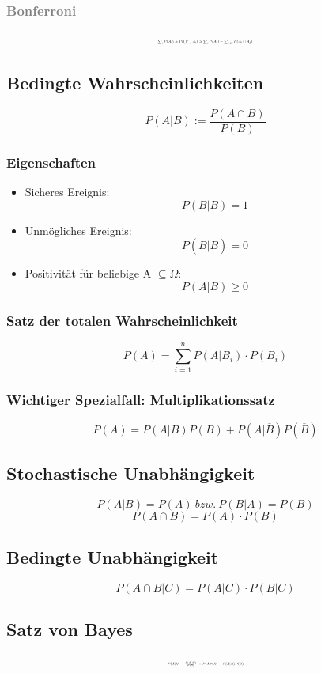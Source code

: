 \documentclass[10pt,a4paper,landscape]{article}
\begin{document}
\begin{multicols}{4}
\textcolor{gray}{\subsubsection*{Bonferroni}
\[ \resizebox{0.25\textwidth}{!}{$
\sum_i P(A_i)\geqslant P(\bigcup_{i=1}^nA_i)\geqslant \sum_i P(A_i) - \sum_{i<j}P(A_i \cup A_j)
$}
\]
}

\subsection{Bedingte Wahrscheinlichkeiten}
\[
P(A|B) := \frac{P(A\cap B)}{P(B)}
\]

\subsubsection*{Eigenschaften}
\begin{itemize}
\item Sicheres Ereignis:
\[
P(B|B) = 1
\]
\item Unmögliches Ereignis:
\[
P(\overline{B}|B) = 0
\]
\item Positivität für beliebige A $\subseteq \Omega$:
\[
P(A|B)\geqslant 0
\]
\end{itemize}

\subsubsection*{Satz der totalen Wahrscheinlichkeit}
\[
P(A)=\sum_{i=1}^n P(A|B_i) \cdot P(B_i)
\]

\subsubsection*{Wichtiger Spezialfall: Multiplikationssatz}
\[
P(A)=P(A|B)P(B)+P(A|\overline{B})P(\overline{B})
\]

\subsection{Stochastische Unabhängigkeit}
\[
P(A|B) = P(A) ~bzw.~ P(B|A)=P(B)
\]
\[
P(A \cap B)=P(A) \cdot P(B)
\]

\subsection{Bedingte Unabhängigkeit}
\[
P(A \cap B|C)=P(A|C)\cdot P(B|C)
\]

\subsection{Satz von Bayes}
\[ \resizebox{0.2\textwidth}{!}{$
P(A|B)=\frac{P(A\cap B)}{P(B)} \Rightarrow P(A\cap B)=P(A|B)P(B)
$}
\]


\end{multicols}
\end{document}

